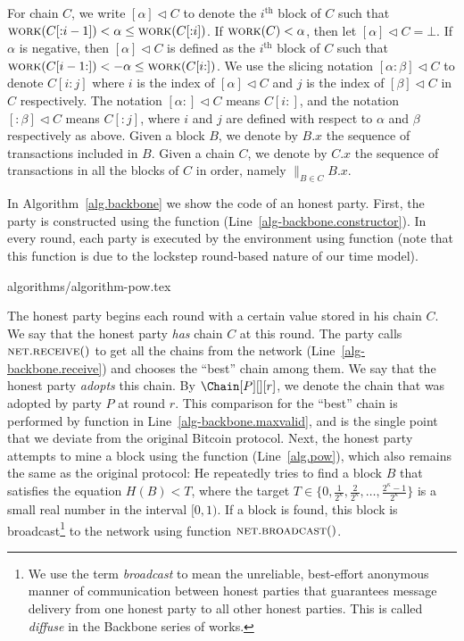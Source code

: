 \noindent
{}
For chain $C$, we write $[\alpha] \lhd C$
to denote the $i^\text{th}$ block of $C$ such that
$\textsc{work}(C[{:}{i - 1}]) < \alpha \leq \textsc{work}(C[{:}{i}])$.
If $\textsc{work}(C) < \alpha$, then let $[\alpha] \lhd C = \bot$.
If $\alpha$ is negative, then $[\alpha] \lhd C$ is defined as
the $i^\text{th}$ block of $C$ such that
$\textsc{work}(C[{i - 1}{:}]) < -\alpha \leq \textsc{work}(C[{i}{:}])$.
We use the slicing notation $[{\alpha}{:}{\beta}] \lhd C$ to denote
$C[{i}{:}{j}]$ where $i$ is the index of $[\alpha] \lhd C$
and $j$ is the index of $[\beta] \lhd C$ in $C$ respectively.
The notation $[{\alpha}{:}] \lhd C$ means $C[{i}{:}]$,
and the notation $[{:}\beta] \lhd C$ means $C[{:}{j}]$,
where $i$ and $j$ are defined with respect to $\alpha$ and $\beta$
respectively as above.
Given a block $B$, we denote by $B.x$ the sequence of transactions
included in $B$.
Given a chain $C$, we denote by $C.x$
the sequence of transactions in all the blocks of $C$ in order, namely
${\big\lVert}_{B \in C} B.x$.

In Algorithm~\ref{alg.backbone} we show the code of an honest party.
First, the party is constructed using the \constructor function (Line~\ref{alg-backbone.constructor}).
In every round, each party is executed by the environment using function \execute
(note that this function is due to the lockstep round-based nature of
our time model).

{algorithms/algorithm-pow.tex}

The honest party begins each round with a certain value stored in his chain $C$.
We say that the honest party \emph{has} chain $C$ at this round. The party calls $\textsc{net}.\textsc{re}\-\textsc{ceive}()$ to get all
the chains from the network (Line~\ref{alg-backbone.receive}) and chooses the
``best'' chain among them. We say that the honest party
\emph{adopts} this chain. By $\Chain[P][][r]$, we denote the chain that was adopted
by party $P$ at round $r$.
This comparison for the ``best'' chain is performed by
function \maxvalid in Line~\ref{alg-backbone.maxvalid}, and
is the single point that we deviate from the original Bitcoin protocol.
Next, the honest party attempts to mine a block using the \pow function (Line~\ref{alg.pow}),
which also remains the same as the original protocol: He repeatedly tries to find a block $B$
that satisfies the \pow equation $H(B) < T$, where the target
$T \in \{0, \frac{1}{2^\kappa}, \frac{2}{2^\kappa}, \ldots, \frac{2^\kappa - 1}{2^\kappa}\}$ is a small real number in
the interval $[0, 1)$.
If a block is found, this block is broadcast\footnote{We use the term \emph{broadcast}
to mean the unreliable, best-effort anonymous manner of communication between honest parties that
guarantees message delivery from one honest party to all other honest parties.
This is called \emph{diffuse} in the Backbone series of works.}
to the network using function $\textsc{net}.\textsc{broadcast}()$.

